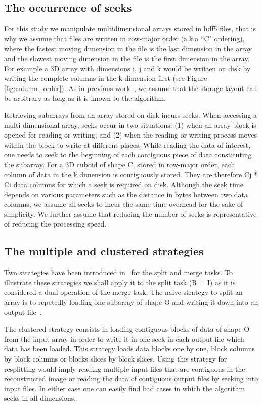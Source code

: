 \documentclass[conference]{IEEEtran}
\begin{document}
\subsection{The occurrence of seeks}
For this study we manipulate multidimensional arrays stored in hdf5 files,
that is why we assume that files are written in row-major order (a.k.a ``C" ordering),
where the fastest moving dimension in the file is the last dimension in the
array and the slowest moving dimension in the file is the first dimension
in the array. For example a 3D array with dimensions i, j and k would be
written on disk by writing the complete columns in the k dimension first
(see Figure \ref{fig:column_order}). As in previous work~\cite{seqalgorithms}, we
assume that the storage layout can be arbitrary as long as it is known to the algorithm.

Retrieving subarrays from an array stored on disk incurs seeks. When accessing a
multi-dimensional array, seeks occur in two situations:
(1) when an array block is opened for reading or writing, and (2) when the
reading or writing process moves within the block to write at different
places. While reading the data of interest, one needs to seek to the
beginning of each contiguous piece of data
constituting the subarray. For a 3D cuboid of shape C, stored in row-major order,
each column of data in the k dimension is contiguously stored. They are therefore
Cj * Ci data columns for which a seek is required on disk. Although the seek
time depends on various parameters such as the distance in bytes between two
data columns, we assume all seeks to incur the same time overhead for the sake
of simplicity. We further assume that reducing the number of seeks is representative
of reducing the processing speed.

\subsection{The multiple and clustered strategies}
Two strategies have been introduced in~\cite{seqalgorithms} for the split and
merge tasks. To illustrate these strategies we shall apply it to the split task
(R = I) as it is considered a dual operation of the merge task.
The naive strategy to split an array is to repetedly loading one
subarray of shape O and writing it down into an output file~\cite{seqalgorithms}.

The clustered strategy consists in loading contiguous blocks of data of shape O
from the input array in order to write it in one seek in each output file which
data has been loaded. This strategy loads data blocks one by one, block columns
by block columns or blocks slices by block slices. Using this strategy for
resplitting would imply reading multiple input files that are contiguous in the
reconstructed image or reading the data of contiguous output files by seeking into
input files. In either case one can easily find bad cases in which the algorithm
seeks in all dimensions.
\end{document}
